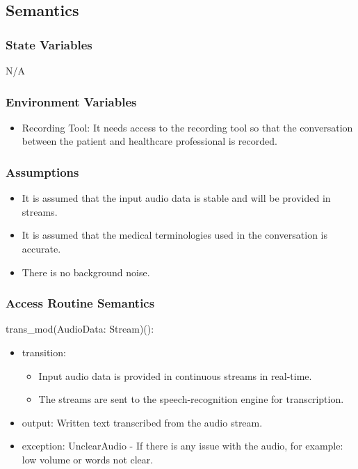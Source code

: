\documentclass[12pt, titlepage]{article}
\begin{document}
\subsection{Semantics}

\subsubsection{State Variables}

N/A

\subsubsection{Environment Variables}

\begin{itemize}
  \item Recording Tool: It needs access to the recording tool so that the conversation between the patient and healthcare professional is recorded.
\end{itemize}

\subsubsection{Assumptions}

\begin{itemize}
  \item It is assumed that the input audio data is stable and will be provided in streams.
  \item It is assumed that the medical terminologies used in the conversation is accurate.
  \item There is no background noise.
\end{itemize}

\subsubsection{Access Routine Semantics}

\noindent trans_mod(AudioData: Stream)(): 
\begin{itemize}
\item transition:
\begin{itemize}
  \item Input audio data is provided in continuous streams in real-time.
  \item The streams are sent to the speech-recognition engine for transcription.
\end{itemize} 
\item output: Written text transcribed from the audio stream. 
\item exception: UnclearAudio - If there is any issue with the audio, for example: low volume or words not clear.  
\end{itemize}
\end{document}
